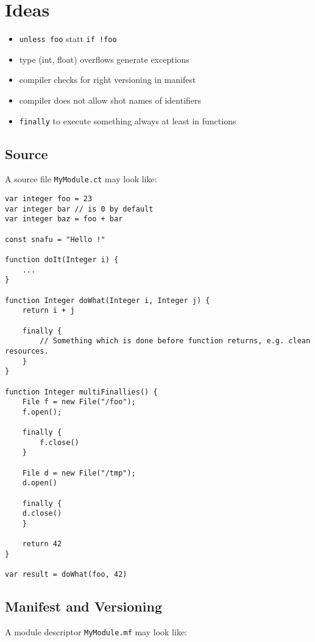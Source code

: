 \documentclass[a4paper,12pt]{article}
\begin{document}
\section{Ideas}

\begin{itemize}
	\item \texttt{unless foo} statt \texttt{if !foo}
	\item type (int, float) overflows generate exceptions
	\item compiler checks for right versioning in manifest
	\item compiler does not allow shot names of identifiers
	\item \texttt{finally} to execute something always at least in functions
\end{itemize}

\subsection{Source}

A source file \texttt{MyModule.ct} may look like:

\begin{verbatim}
var integer foo = 23
var integer bar // is 0 by default
var integer baz = foo + bar

const snafu = "Hello !"

function doIt(Integer i) {
    ...
}

function Integer doWhat(Integer i, Integer j) {
    return i + j
    
    finally {
    	// Something which is done before function returns, e.g. clean resources.
    }
}

function Integer multiFinallies() {
    File f = new File("/foo");
    f.open();
    
    finally {
        f.close()
    }
    
    File d = new File("/tmp");
    d.open()
    
    finally {
    d.close()
    }
    
    return 42
}

var result = doWhat(foo, 42)	
\end{verbatim}

\subsection{Manifest and Versioning}

A module descriptor \texttt{MyModule.mf} may look like:
\end{document}
